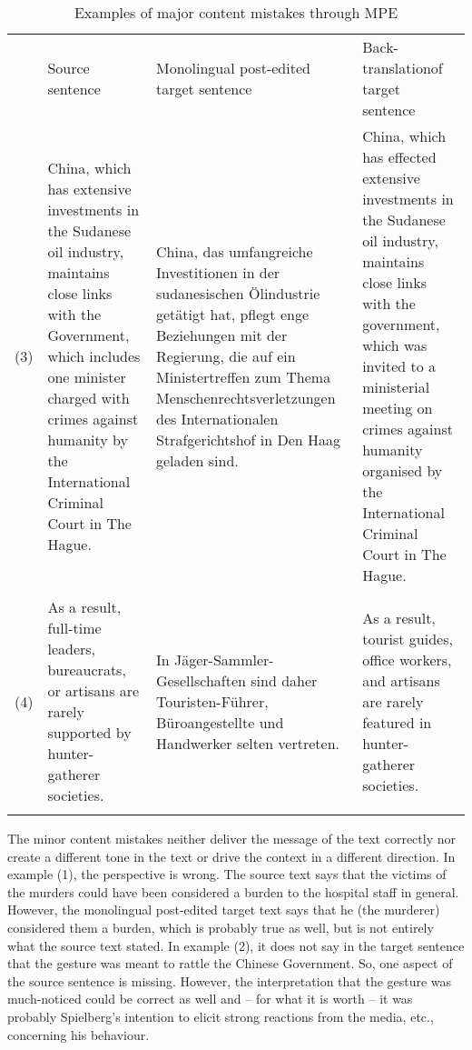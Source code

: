 \documentclass[output=paper]{langsci/langscibook}
\begin{document}
\begin{table}[t]
\begin{tabularx}{\textwidth}{lXp{3.6cm}p{3cm}} 
    & Source \newline sentence & Monolingual post-\newline edited target sentence & Back-translation\newline  of target sentence \\
\lsptoprule
(3) & China, which has extensive investments in the Sudanese oil industry, maintains close links with the Government, which includes one minister charged with crimes against humanity by the International Criminal Court in The Hague. & China, das umfangreiche Investitionen in der sudanesischen Ölindustrie getätigt hat, pflegt enge Beziehungen mit der Regierung, die auf ein Ministertreffen zum Thema Menschenrechtsverletzungen des Internationalen Strafgerichtshof in Den Haag geladen sind. & China, which has effected extensive investments in the Sudanese oil industry, maintains close links with the government, which was invited to a ministerial meeting on crimes against humanity organised by the International Criminal Court in The Hague.\\
\\
(4) & As a result, full-time leaders, bureaucrats, or artisans are rarely supported by hunter-gatherer societies. & In Jäger-Sammler-Gesellschaften sind daher Touristen-Führer, Büroangestellte und Handwerker selten vertreten. & As a result, tourist guides, office workers, and artisans are rarely featured in hunter-gatherer societies.\\
\lspbottomrule
\end{tabularx}
\caption{Examples of major content mistakes through MPE}
\label{nitzke:tab:1b}
\end{table}

The minor content mistakes neither deliver the message of the text correctly nor create a different tone in the text or drive the context in a different direction. In example (1), the perspective is wrong. The source text says that the victims of the murders could have been considered a burden to the hospital staff in general. However, the monolingual post-edited target text says that he (the murderer) considered them a burden, which is probably true as well, but is not entirely what the source text stated. In example (2), it does not say in the target sentence that the gesture was meant to rattle the Chinese Government. So, one aspect of the source sentence is missing. However, the interpretation that the gesture was much-noticed could be correct as well and -- for what it is worth -- it was probably Spielberg's intention to elicit strong reactions from the media, etc., concerning his behaviour.
\end{document}
